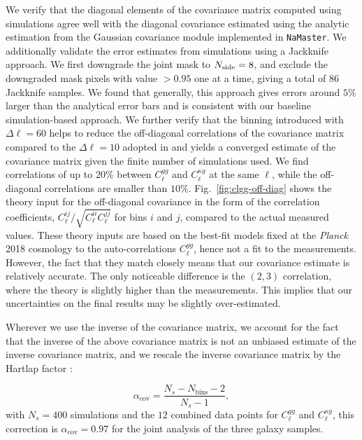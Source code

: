 \documentclass[twocolumn]{aastex631}
\begin{document}
{We verify that the diagonal elements of the covariance matrix computed using simulations agree well with the diagonal covariance estimated using the analytic estimation from the Gaussian covariance module implemented in \texttt{NaMaster}. 
{We additionally validate the error estimates from simulations using a Jackknife approach. We first downgrade the joint mask to $N_{\rm side}=8$, and exclude the downgraded mask pixels with value $>0.95$ one at a time, giving a total of 86 Jackknife samples.
We found that generally, this approach gives errors around $5\%$ larger than the analytical error bars and is consistent with our baseline simulation-based approach.}
We further verify that the binning introduced with $\Delta\ell=60$ helps to reduce the off-diagonal correlations of the covariance matrix compared to the $\Delta\ell=10$ adopted in \citep{hang2021} and yields a converged estimate of the covariance matrix given the finite number of simulations used.
We find correlations of up to $20\%$ between $C^{gg}_\ell$ and $C^{\kappa{g}}_\ell$ at the same $\ell$, while the off-diagonal correlations are smaller than $10\%$.
Fig.~\ref{fig:clgg-off-diag} shows the theory input for the off-diagonal covariance in the form of the correlation coefficients, $C_{\ell}^{ij}/\sqrt{C_{\ell}^{ii}C_{\ell}^{jj}}$ for bins $i$ and $j$, compared to the actual measured values. These theory inputs are based on the best-fit \cite{hang2021} models fixed at the \textit{Planck} 2018 cosmology to the auto-correlations $C_{\ell}^{gg}$, hence {not a fit to the measurements. However, the fact that they match closely means that our covariance estimate is relatively accurate. The only noticeable difference is the $(2,3)$ correlation, where the theory is slightly higher than the measurements. This implies that our uncertainties on the final results may be slightly over-estimated.}

Wherever we use the inverse of the covariance matrix, we account for the fact that the inverse of the above covariance matrix is not an unbiased estimate of the inverse covariance matrix, and we rescale the inverse covariance matrix by the Hartlap factor \citep{Hartlap_2006}:

\begin{equation}
    \alpha_\mathrm{cov}=\frac{N_s-N_\mathrm{bins}-2}{N_s-1},
\end{equation}
with $N_s=400$ simulations and the $12$ combined data points for $C^{gg}_\ell$ and $C^{\kappa{g}}_\ell$, this correction is $\alpha_\mathrm{cov}=0.97$ for the joint analysis of the three galaxy samples.

}
\end{document}
